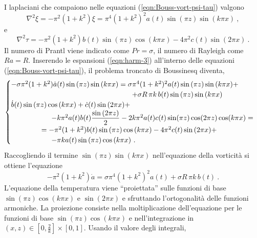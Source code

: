 \documentclass{article}
\begin{document}
%
I laplaciani che compaiono nelle equazioni (\ref{eqn:Bouss-vort-psi-tau}) valgono
\begin{equation}
    \nabla^2 \xi = -\pi^2 (1+k^2) \xi = \pi^4 (1+k^2)^2 a(t) \sin{(\pi z)} \sin{(k \pi x)} \ , 
\end{equation}
e
\begin{equation}
    \nabla^2 \tau = -\pi^2 (1+k^2) b(t) \sin{(\pi z)}\cos{(k \pi x)} - 4 \pi^2 c(t) \sin{(2\pi x)} \ .
\end{equation}
%
Il numero di Prantl viene indicato come $Pr = \sigma$, il numero di Rayleigh come $Ra = R$.
Inserendo le espansioni (\ref{eqn:harm-3}) all'interno delle equazioni (\ref{eqn:Bouss-vort-psi-tau}), il problema troncato di Boussinesq diventa,
\begin{equation}
    \begin{cases}
- \sigma \pi^2 (1+k^2) \dot{a}(t) \sin{(\pi z)} \sin{(k\pi x )} = \sigma \pi^4 (1+k^2)^2 a(t) \sin{(\pi z)} \sin{(k \pi x)} + \\
      \hspace{6.0cm} + \sigma R \, \pi k \, b(t) \sin{(\pi z)}\sin{(k \pi x)} \\
     \dot{b}(t)\sin{(\pi z)} \cos{(k\pi x )} + \dot{c}(t) \sin{(2\pi x)} + \\
     \hspace{2.0cm} - k \pi^2 a(t) b(t) \dfrac{\sin{(2 \pi z)}}{2} -
    2 k \pi^2 a(t)c(t) \sin(\pi z) \cos(2\pi z) \cos(k \pi x) = \\ 
    \hspace{1.5cm} = -\pi^2 (1+k^2) b(t) \sin{(\pi z)}\cos{(k \pi x)} - 4 \pi^2 c(t) \sin{(2\pi x)} + \\
    \hspace{2.0cm} - \pi k a(t) \sin{(\pi z)} \cos{(k \pi x)} \ .
    \end{cases}
\end{equation}
Raccogliendo il termine $\sin{(\pi z)} \sin{(k \pi x)}$ nell'equazione della vorticità si ottiene l'equazione
\begin{equation}
    - \pi^2 (1+k^2) \dot{a} = \sigma \pi^4 (1+k^2)^2 a(t) +  \sigma R \, \pi k \, b(t) \ .
\end{equation}
L'equazione della temperatura viene ``proiettata'' sulle funzioni di base $\sin{(\pi z)} \cos{(k \pi x)}$ e $\sin{(2 \pi x)}$ e sfruttando l'ortogonalità delle funzioni armoniche.
La proiezione consiste nella moltiplicazione dell'equazione per le funzioni di base $\sin{(\pi z)} \cos{(k \pi x)}$ e nell'integrazione in $(x,z) \in \left[0,\frac{2}{k}\right]\times\left[0,1\right]$. Usando il valore degli integrali,
\end{document}
